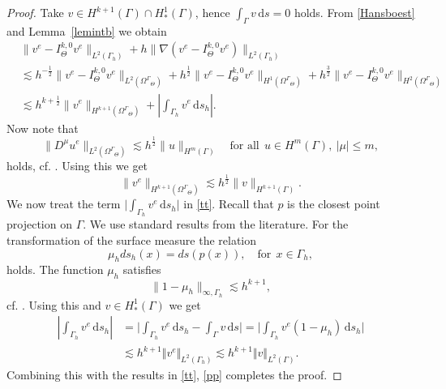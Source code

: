 \documentclass[final]{siamltex}
\begin{document}
\begin{proof} Take $v \in H^{k+1}(\Gamma) \cap H^1_\ast(\Gamma)$, hence $\int_{\Gamma} v {\,\mathrm{d} s} =0 $ holds.
From \eqref{Hansboest} and Lemma~\ref{lemintb} we obtain
\begin{align}
  & \|v^e-{I_{\Theta}^{k,0}} v^e \|_{L^2(\Gamma_h)} + h \|\nabla(v^e- {I_{\Theta}^{k,0}} v^e)\|_{L^2(\Gamma_h)} \nonumber \\ & \lesssim h^{-\frac12}\| v^e - {I_{\Theta}^{k,0}} v^e \|_{L^2({\Omega^{\Gamma}}_\Theta)} + h^\frac12 \| v^e - {I_{\Theta}^{k,0}} v^e \|_{H^1({\Omega^{\Gamma}}_\Theta)} + h^\frac32 \| v^e - {I_{\Theta}^{k,0}} v^e \|_{H^2({\Omega^{\Gamma}}_\Theta)} \nonumber \\
   & \lesssim h^{k+\frac12} \|v^e \|_{H^{k+1}({\Omega^{\Gamma}}_\Theta)}+ \left|\int_{\Gamma_h} v^e {\,\mathrm{d} {s_h}} \right|. \label{tt}
\end{align}
Now note that 
\begin{equation} \label{nb}
 \|D^\mu u^e\|_{L^2({\Omega^{\Gamma}}_\Theta)} \lesssim h^\frac12 \|u\|_{H^m(\Gamma)} \quad \text{for all}~~u \in H^m(\Gamma), ~|\mu| \leq m,
 \end{equation} 
holds, cf. \cite[Lemma 3.1]{reusken2015}. Using this we get
\begin{equation} \label{pp}
  \|v^e \|_{H^{k+1}({\Omega^{\Gamma}}_\Theta)} \lesssim h^\frac12 \|v \|_{H^{k+1}(\Gamma)}. 
\end{equation}
We now treat the term $\lvert \int_{\Gamma_h} v^e {\,\mathrm{d} {s_h}}\rvert$ in \eqref{tt}.
Recall that $p$ is the closest point projection on $\Gamma$. We use standard results from the literature. For the transformation of the surface measure the relation 
\begin{equation} \label{surfmeasuer}
 \mu_h ds_h(x) = ds(p(x)), \quad \text{for}~~ x \in \Gamma_h,
\end{equation}
holds. The function $\mu_h$ satisfies
\begin{equation} \label{estmu}
 \|1- \mu_h\|_{\infty,\Gamma_h} \lesssim h^{k+1},
\end{equation}
cf. \cite{Demlow06,reusken2015}.
Using this and $v \in H_\ast^1(\Gamma)$ we get
\begin{equation} \label{ttp} \begin{split}
 \left| \int_{\Gamma_h} v^e {\,\mathrm{d} {s_h}} \right|& = 
\Big| \int_{\Gamma_h} v^e {\,\mathrm{d} {s_h}} - \int_{\Gamma} v {\,\mathrm{d} {s}} \Big|
 = \Big| \int_{\Gamma_h} v^e ( 1 - \mu_h) {\,\mathrm{d} {s_h}} \Big| \\ & \lesssim h^{k+1} \Vert v^e \Vert_{L^2(\Gamma_h)} \lesssim h^{k+1} \Vert v \Vert_{L^2(\Gamma)}. 
\end{split} \end{equation}
Combining this with the results in \eqref{tt}, \eqref{pp} completes the proof.
\end{proof}
\end{document}
